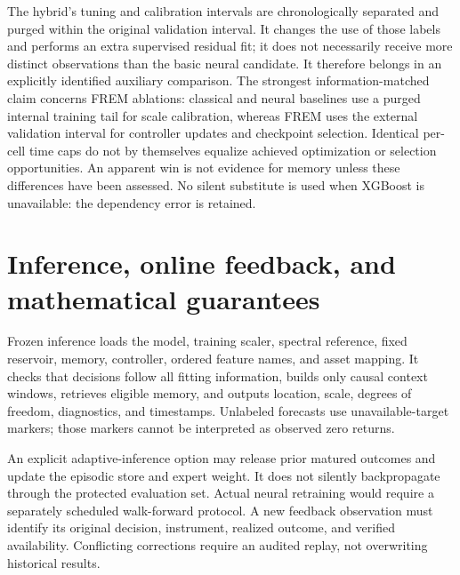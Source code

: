 \documentclass[11pt,a4paper]{article}
\begin{document}
The hybrid's tuning and calibration intervals are chronologically separated and purged within the original validation interval. It changes the use of those labels and performs an extra supervised residual fit; it does not necessarily receive more distinct observations than the basic neural candidate. It therefore belongs in an explicitly identified auxiliary comparison. The strongest information-matched claim concerns FREM ablations: classical and neural baselines use a purged internal training tail for scale calibration, whereas FREM uses the external validation interval for controller updates and checkpoint selection. Identical per-cell time caps do not by themselves equalize achieved optimization or selection opportunities. An apparent win is not evidence for memory unless these differences have been assessed. No silent substitute is used when XGBoost is unavailable: the dependency error is retained.

\section{Inference, online feedback, and mathematical guarantees}

Frozen inference loads the model, training scaler, spectral reference, fixed reservoir, memory, controller, ordered feature names, and asset mapping. It checks that decisions follow all fitting information, builds only causal context windows, retrieves eligible memory, and outputs location, scale, degrees of freedom, diagnostics, and timestamps. Unlabeled forecasts use unavailable-target markers; those markers cannot be interpreted as observed zero returns.

An explicit adaptive-inference option may release prior matured outcomes and update the episodic store and expert weight. It does not silently backpropagate through the protected evaluation set. Actual neural retraining would require a separately scheduled walk-forward protocol. A new feedback observation must identify its original decision, instrument, realized outcome, and verified availability. Conflicting corrections require an audited replay, not overwriting historical results.
\end{document}
